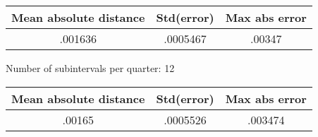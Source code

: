 \documentclass[12 pt, oneside]{article}
\theoremstyle{definition}
\theoremstyle{definition}
\theoremstyle{definition}
\begin{document}
\begin{center}
\begin{tabular}{|c|c|c|}
\hline
  Mean absolute distance & Std(error) & Max abs error\\
\hline
.001636 & .0005467 & .00347\\
\hline
\end{tabular}
\end{center}



Number of subintervals per quarter: 12

\begin{center}
\begin{tabular}{|c|c|c|}
\hline
  Mean absolute distance & Std(error) & Max abs error\\
\hline
.00165 & .0005526& .003474\\
\hline
\end{tabular}
\end{center}
\end{document}
